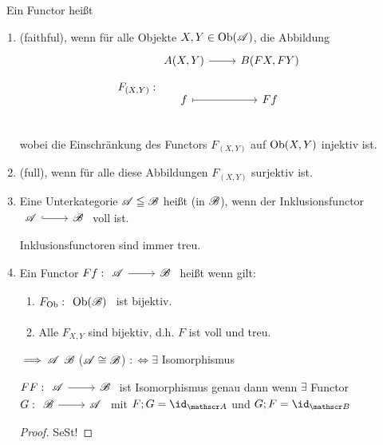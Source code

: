 \begin{beispiel}\
	Ein Functor heißt 
	\begin{enumerate}[label=]
		\item {} (faithful), wenn für alle Objekte $X,Y \in \operatorname{Ob}(\mathscr A)$, die Abbildung
		\begin{align*}
		F_{(X,Y)}: 
		\begin{tikzcd}[ampersand replacement=\&] %
		A(X,Y) \arrow[r] \& B(FX,FY)\\
		f \arrow[r, maps to] \& Ff\\
		\end{tikzcd}
		\end{align*}
		wobei die Einschränkung des Functors $F_{(X,Y)}$ auf $\operatorname{Ob}(X,Y)$ injektiv ist.
		\item {} (full), wenn für alle diese Abbildungen $F_{(X,Y)}$ surjektiv ist.
		\item Eine Unterkategorie $\mathscr A \leqq \mathscr B$ heißt \define{voll} (in $\mathscr B$), wenn der Inklusionsfunctor\\ $\begin{tikzcd} \CatA \arrow[r, hook] & \CatB \end{tikzcd}$ voll ist.
		\begin{bemerkung}
			Inklusionsfunctoren sind immer treu.
		\end{bemerkung}
		\item Ein Functor $Ff: \begin{tikzcd} \CatA \arrow[r]& \CatB \end{tikzcd}$ heißt  wenn gilt:
		\begin{enumerate}
			\item $F_{\Ob}: \begin{tikzcd} \Ob(\CatB) \end{tikzcd}$ ist bijektiv.
			\item Alle $F_{X,Y}$ sind bijektiv, d.h. $F$ ist voll und treu.
		\end{enumerate}
		$\implies \mathscr A$  $\mathscr B$ ($\mathscr A \cong \mathscr B$) $:\Longleftrightarrow \exists$ Isomorphismus
		\begin{bemerkung}
			$F \mit F: \begin{tikzcd} \CatA \arrow[r]& \CatB \end{tikzcd}$ ist Isomorphismus genau dann wenn $\exists$ Functor $G: \begin{tikzcd} \CatB \arrow[r]& \CatA \end{tikzcd}$ mit $F;G = \id_{\CatA}$ und $G;F = \id_{\CatB}$
		\end{bemerkung}
		\begin{proof}
			SeSt!
		\end{proof}
	\end{enumerate}
\end{beispiel}
